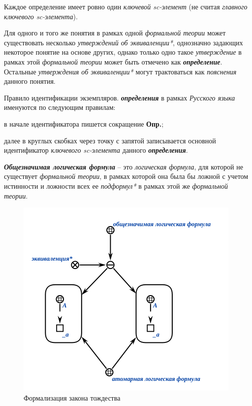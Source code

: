 Каждое определение имеет ровно один \textit{ключевой sc-элемент\scnrolesign} (не считая \textit{главного ключевого sc-элемента\scnrolesign}).

Для одного и того же понятия в рамках одной \textit{формальной теории} может существовать несколько \textit{утверждений об эквиваленции*}, однозначно задающих некоторое понятие на основе других, однако только одно такое \textit{утверждение} в рамках этой \textit{формальной теории} может быть отмечено как \textbf{\textit{определение}}. Остальные \textit{утверждения об эквиваленции*} могут трактоваться как \textit{пояснения} данного понятия.

Правило идентификации экземпляров. \textbf{\textit{определения}} в рамках \textit{Русского языка} именуются по следующим правилам:
\begin{textitemize}
	\item{в начале идентификатора пишется сокращение \textbf{Опр.};}
	\item{далее в круглых скобках через точку с запятой записывается основной идентификатор  \textit{ключевого sc-элемента\scnrolesign} данного \textbf{\textit{определения}}.}
\end{textitemize}


\begin{SCn}
\end{SCn}
\textbf{\textit{Общезначимая логическая формула}} -- это \textit{логическая формула}, для которой не существует \textit{формальной теории}, в рамках которой она была бы ложной с учетом истинности и ложности всех ее \textit{подформул*} в рамках этой же \textit{формальной теории}.

\begin{figure}[http]
\includegraphics[scale=0.8]{author/part2/figures/logic/valid_formula.png}
\caption{Формализация закона тождества}
\label{fig:valid_formula}
\end{figure}

